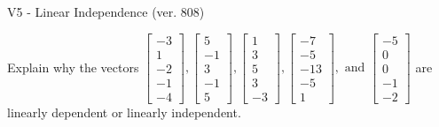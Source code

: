 \begin{exercise}
  \begin{exerciseTitle}V5 - Linear Independence (ver. 808)\end{exerciseTitle}
  \begin{exerciseStatement}
    Explain why the vectors \(\left[\begin{array}{r}
-3 \\
1 \\
-2 \\
-1 \\
-4
\end{array}\right] , \left[\begin{array}{r}
5 \\
-1 \\
3 \\
-1 \\
5
\end{array}\right] , \left[\begin{array}{r}
1 \\
3 \\
5 \\
3 \\
-3
\end{array}\right] , \left[\begin{array}{r}
-7 \\
-5 \\
-13 \\
-5 \\
1
\end{array}\right] , \text{ and } \left[\begin{array}{r}
-5 \\
0 \\
0 \\
-1 \\
-2
\end{array}\right]\) are linearly dependent or linearly independent.	



\end{exerciseStatement}
\end{exercise}
